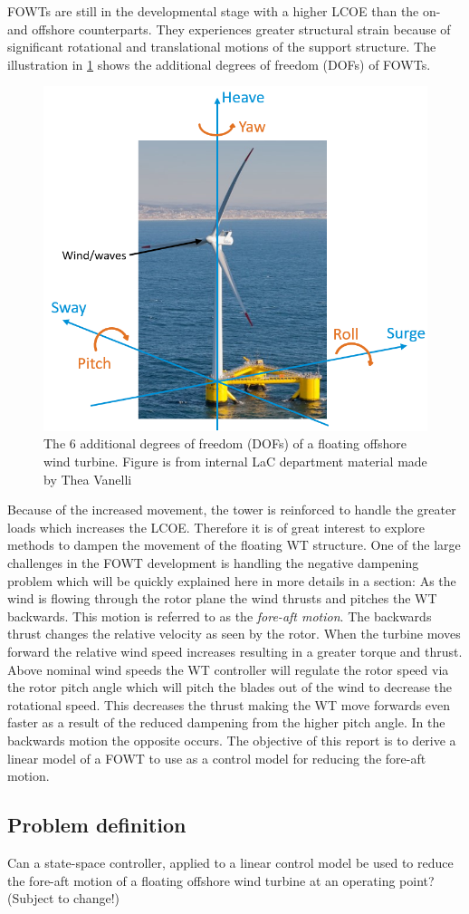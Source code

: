 FOWTs are still in the developmental stage with a higher LCOE than the on- and offshore counterparts. They experiences greater structural strain because of significant rotational and translational motions of the support structure. The illustration in \cref{fig:fowt_coordinates} shows the additional degrees of freedom (DOFs) of FOWTs.
\begin{figure}[ht]
	\centering
	\includegraphics[width=0.55\linewidth]{Graphics/FOWTcoordinates.png}
	\caption{The 6 additional degrees of freedom (DOFs) of a floating offshore wind turbine. Figure is from internal LaC department material made by Thea Vanelli}
	\label{fig:fowt_coordinates}
\end{figure}
Because of the increased movement, the tower is reinforced to handle the greater loads which increases the LCOE. Therefore it is of great interest to explore methods to dampen the movement of the floating WT structure. One of the large challenges in the FOWT development is handling the negative dampening problem which will be quickly explained here in more details in a section: As the wind is flowing through the rotor plane the wind thrusts and pitches the WT backwards. This motion is referred to as the \textit{fore-aft motion}. The backwards thrust changes the relative velocity as seen by the rotor. When the turbine moves forward the relative wind speed increases resulting in a greater torque and thrust. Above nominal wind speeds the WT controller will regulate the rotor speed via the rotor pitch angle which will pitch the blades out of the wind to decrease the rotational speed. This decreases the thrust making the WT move forwards even faster as a result of the reduced dampening from the higher pitch angle. In the backwards motion the opposite occurs. The objective of this report is to derive a linear model of a FOWT to use as a control model for reducing the fore-aft motion. 



\subsection{Problem definition} \label{sec:intro_problemdef}
Can a state-space controller, applied to a linear control model be used to reduce the fore-aft motion of a floating offshore wind turbine at an operating point? (Subject to change!)


